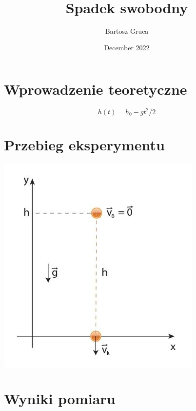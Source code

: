 \documentclass{article}
\title{Spadek swobodny}
\author{Bartosz Gruca}
\date{December 2022}
\begin{document}
\maketitle

\section{Wprowadzenie teoretyczne}

\begin{equation}
    h(t)=h_0- gt^2/2
\end{equation}

\section{Przebieg eksperymentu}

\begin{center}
\includegraphics[scale=0.5]{zdj.jpg}
\end{center}

\section{Wyniki pomiaru}
\end{document}

